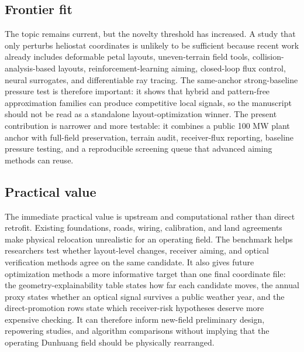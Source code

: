 \documentclass[final,3p,times]{elsarticle}
\begin{document}
\subsection{Frontier fit}
The topic remains current, but the novelty threshold has increased. A study that only perturbs heliostat coordinates is unlikely to be sufficient because recent work already includes deformable petal layouts, uneven-terrain field tools, collision-analysis-based layouts, reinforcement-learning aiming, closed-loop flux control, neural surrogates, and differentiable ray tracing. The same-anchor strong-baseline pressure test is therefore important: it shows that hybrid and pattern-free approximation families can produce competitive local signals, so the manuscript should not be read as a standalone layout-optimization winner. The present contribution is narrower and more testable: it combines a public 100 MW plant anchor with full-field preservation, terrain audit, receiver-flux reporting, baseline pressure testing, and a reproducible screening queue that advanced aiming methods can reuse.

\subsection{Practical value}
The immediate practical value is upstream and computational rather than direct retrofit. Existing foundations, roads, wiring, calibration, and land agreements make physical relocation unrealistic for an operating field. The benchmark helps researchers test whether layout-level changes, receiver aiming, and optical verification methods agree on the same candidate. It also gives future optimization methods a more informative target than one final coordinate file: the geometry-explainability table states how far each candidate moves, the annual proxy states whether an optical signal survives a public weather year, and the direct-promotion rows state which receiver-risk hypotheses deserve more expensive checking. It can therefore inform new-field preliminary design, repowering studies, and algorithm comparisons without implying that the operating Dunhuang field should be physically rearranged.
\end{document}
